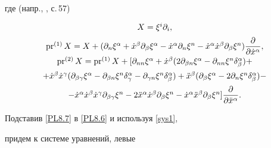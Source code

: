 где (напр., \cite{Ovsyannikov_78}, с.\,57) 


\begin{equation}\label{PL8.7}


\begin{array}{c}


X=\xi^i\partial_i,\\[2mm]


%


\pr^{(1)}X=X+(\partial_n\xi^\alpha+\Dot x^\beta


\partial_\beta \xi^\alpha-\Dot x^\alpha \partial_n \xi^n -


\Dot x^\alpha\Dot x^\beta \partial_\beta \xi^n)


\dfrac{\partial}{\partial \Dot x^\alpha},\\[2mm]


%


\pr^{(2)}X=\pr^{(1)}X+[\partial_{nn}\xi^\alpha+\Dot x^\beta


(2\partial_{\beta n}\xi^\alpha - \partial_{nn}\xi^n \delta_\beta^\alpha)+\\[2mm]


%


+\Dot x^\beta \Dot x^\gamma(\partial_{\beta \gamma}\xi^\alpha -


\partial_{\beta n}\xi^n \delta_\gamma^\alpha-\partial_{\gamma n}\xi^n


\delta_\beta^\alpha)+


\Ddot x^\beta (\partial_\beta \xi^\alpha -2 \partial_n \xi^n


\delta_\beta^\alpha)- \\[2mm]


%


-\Dot x^\alpha \Dot x^\beta \Dot x^\gamma


\partial_{\beta \gamma} \xi^n -


2\Ddot x^\alpha \Dot x^\beta \partial_\beta


\xi^n - \Dot x^\alpha \ddot x^\beta \partial_\beta \xi^n]


\dfrac{\partial}{\partial \Ddot x^\alpha}.


\end{array}


\end{equation}





Подставив \eqref{PL8.7} в \eqref{PL8.6} и используя \eqref{sys1},


придем к системе уравнений, левые


